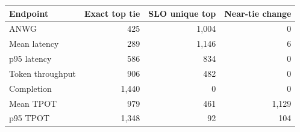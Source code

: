 \begin{tabular}{lrrr}
\toprule
Endpoint & Exact top tie & SLO unique top & Near-tie change \\
\midrule
ANWG & 425 & 1,004 & 0 \\
Mean latency & 289 & 1,146 & 6 \\
p95 latency & 586 & 834 & 0 \\
Token throughput & 906 & 482 & 0 \\
Completion & 1,440 & 0 & 0 \\
Mean TPOT & 979 & 461 & 1,129 \\
p95 TPOT & 1,348 & 92 & 104 \\
\bottomrule
\end{tabular}
